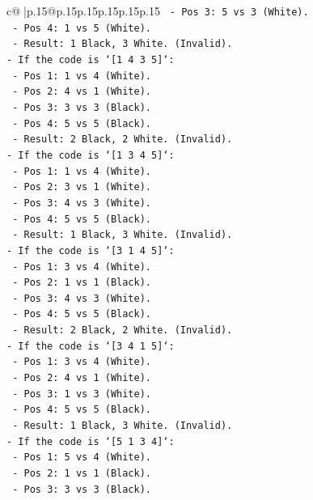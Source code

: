 \documentclass{article}
\begin{document}
{\begin{supertabular}{c@{$\;$}|p{.15\linewidth}@{}p{.15\linewidth}p{.15\linewidth}p{.15\linewidth}p{.15\linewidth}p{.15\linewidth}}
{{{\texttt{  {-} Pos 3: 5 vs 3 (White).} \\
\texttt{  {-} Pos 4: 1 vs 5 (White).} \\
\texttt{  {-} Result: 1 Black, 3 White. (Invalid).} \\
\texttt{{-} If the code is `{[}1 4 3 5{]}`:} \\
\texttt{  {-} Pos 1: 1 vs 4 (White).} \\
\texttt{  {-} Pos 2: 4 vs 1 (White).} \\
\texttt{  {-} Pos 3: 3 vs 3 (Black).} \\
\texttt{  {-} Pos 4: 5 vs 5 (Black).} \\
\texttt{  {-} Result: 2 Black, 2 White. (Invalid).} \\
\texttt{{-} If the code is `{[}1 3 4 5{]}`:} \\
\texttt{  {-} Pos 1: 1 vs 4 (White).} \\
\texttt{  {-} Pos 2: 3 vs 1 (White).} \\
\texttt{  {-} Pos 3: 4 vs 3 (White).} \\
\texttt{  {-} Pos 4: 5 vs 5 (Black).} \\
\texttt{  {-} Result: 1 Black, 3 White. (Invalid).} \\
\texttt{{-} If the code is `{[}3 1 4 5{]}`:} \\
\texttt{  {-} Pos 1: 3 vs 4 (White).} \\
\texttt{  {-} Pos 2: 1 vs 1 (Black).} \\
\texttt{  {-} Pos 3: 4 vs 3 (White).} \\
\texttt{  {-} Pos 4: 5 vs 5 (Black).} \\
\texttt{  {-} Result: 2 Black, 2 White. (Invalid).} \\
\texttt{{-} If the code is `{[}3 4 1 5{]}`:} \\
\texttt{  {-} Pos 1: 3 vs 4 (White).} \\
\texttt{  {-} Pos 2: 4 vs 1 (White).} \\
\texttt{  {-} Pos 3: 1 vs 3 (White).} \\
\texttt{  {-} Pos 4: 5 vs 5 (Black).} \\
\texttt{  {-} Result: 1 Black, 3 White. (Invalid).} \\
\texttt{{-} If the code is `{[}5 1 3 4{]}`:} \\
\texttt{  {-} Pos 1: 5 vs 4 (White).} \\
\texttt{  {-} Pos 2: 1 vs 1 (Black).} \\
\texttt{  {-} Pos 3: 3 vs 3 (Black).} \\
}}}
\end{supertabular}}
\end{document}
